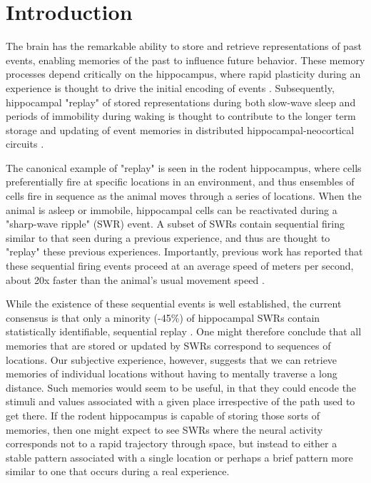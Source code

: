 \documentclass[9pt,lineno]{elife}
\begin{document}
\section*{Introduction}

The brain has the remarkable ability to store and retrieve representations of past events, enabling memories of the past to influence future behavior. These memory processes depend critically on the hippocampus, where rapid plasticity during an experience is thought to drive the initial encoding of events \citep{EichenbaumConditioningConsciousRecollection2004}. Subsequently, hippocampal "replay" of stored representations during both slow-wave sleep and periods of immobility during waking is thought to contribute to the longer term storage and updating of event memories in distributed hippocampal-neocortical circuits \citep{Franklandorganizationrecentremote2005, Joohippocampalsharpwave2018, CarrHippocampalreplayawake2011}. 

The canonical example of "replay" is seen in the rodent hippocampus, where cells preferentially fire at specific locations in an environment, and thus ensembles of cells fire in sequence as the animal moves through a series of locations. When the animal is asleep or immobile, hippocampal cells can be reactivated during a "sharp-wave ripple" (SWR) event. A subset of SWRs contain sequential firing similar to that seen during a previous experience, and thus are thought to "replay" these previous experiences. Importantly, previous work has reported that these sequential firing events proceed at an average speed of  meters per second, about 20x faster than the animal's usual movement speed \citep{NadasdyReplayTimeCompression1999, LeeMemorySequentialExperience2002, DavidsonHippocampalReplayExtended2009, KarlssonAwakereplayremote2009}. 

While the existence of these sequential events is well established, the current consensus is that only a minority (-45\%) of hippocampal SWRs contain statistically identifiable, sequential replay \citep{MichonPostlearningHippocampalReplay2019, KaeferReplayBehavioralSequences2020, ShinDynamicsAwakeHippocampalPrefrontal2019, DavidsonHippocampalReplayExtended2009, Tingleymethodsreactivationreplay2020}. One might therefore conclude that all memories that are stored or updated by SWRs correspond to sequences of locations. Our subjective experience, however, suggests that we can retrieve memories of individual locations without having to mentally traverse a long distance. Such memories would seem to be useful, in that they could encode the stimuli and values associated with a given place irrespective of the path used to get there. If the rodent hippocampus is capable of storing those sorts of memories, then one might expect to see SWRs where the neural activity corresponds not to a rapid trajectory through space, but instead to either a stable pattern associated with a single location or perhaps a brief pattern more similar to one that occurs during a real experience. 
\end{document}
